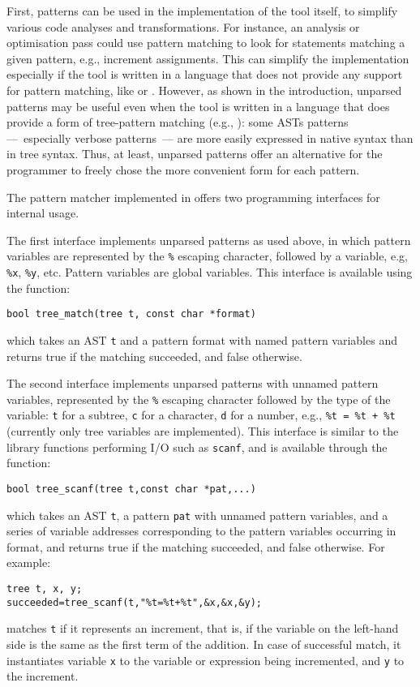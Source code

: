 First, patterns can be used in the implementation of the tool itself,
to simplify various code analyses and transformations. For instance,
an analysis or optimisation pass could use pattern matching to look
for statements matching a given pattern, e.g., increment assignments.
This can simplify the implementation especially if the tool is written
in a language that does not provide any support for pattern matching,
like \Clang or \Java. However, as shown in the introduction, unparsed
patterns may be useful even when the tool is written in a language
that does provide a form of tree\hyp{}pattern matching (e.g., \ML):
some ASTs patterns ---~especially verbose patterns~--- are more easily
expressed in native syntax than in tree syntax. Thus, at least,
unparsed patterns offer an alternative for the programmer to freely
chose the more convenient form for each pattern.

The pattern matcher implemented in \MyGCC offers two programming
interfaces for internal usage.

The first interface implements unparsed patterns as used above, in
which pattern variables are represented by the \texttt{\%} escaping
character, followed by a variable, e.g, \texttt{\%x}, \texttt{\%y},
etc. Pattern variables are global variables. This interface is
available using the \Clang function:
\begin{verbatim}
bool tree_match(tree t, const char *format)
\end{verbatim}
which takes an AST \texttt{t} and a pattern format with named
pattern variables and returns true if the matching succeeded, and
false otherwise. 

The second interface implements unparsed patterns with unnamed pattern
variables, represented by the \texttt{\%} escaping character followed
by the type of the variable: \texttt{t} for a subtree, \texttt{c} for
a character, \texttt{d} for a number, e.g., \texttt{\%t = \%t + \%t}
(currently only tree variables are implemented). This interface is
similar to the \Clang library functions performing I/O such as
\texttt{scanf}, and is available through the \Clang function:
\begin{verbatim}
bool tree_scanf(tree t,const char *pat,...)
\end{verbatim}
which takes an AST \texttt{t}, a pattern \texttt{pat} with unnamed
pattern variables, and a series of variable addresses corresponding to
the pattern variables occurring in format, and returns true if the
matching succeeded, and false otherwise. For example:
\begin{verbatim}
tree t, x, y;
succeeded=tree_scanf(t,"%t=%t+%t",&x,&x,&y);
\end{verbatim}
matches \texttt{t} if it represents an increment, that is, if the
variable on the left\hyp{}hand side is the same as the first term of
the addition. In case of successful match, it instantiates variable
\texttt{x} to the variable or expression being incremented, and
\texttt{y} to the increment.

